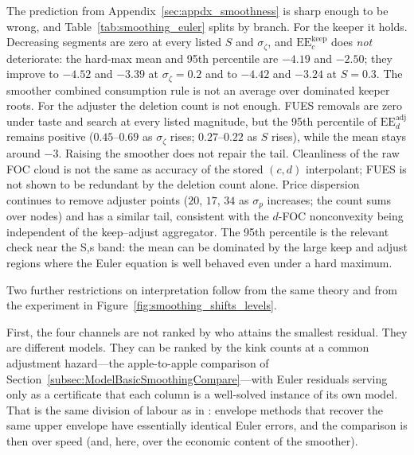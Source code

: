 \begin{table}[htbp]
\centering
\caption{Period-$t$ kink counts and Euler residuals under the hard-max baseline and the same $\sigma_\zeta$, $S$, and $\sigma_p$ sweep as Figure~\ref{fig:smoothing_shifts_levels}. Residuals are mean and 95th percentile of~\eqref{eq:judd_ee} on an off-grid test mesh; constrained points excluded. The $\sigma_p$ adjuster kink count sums over price nodes.}
\label{tab:smoothing_euler}
\small

\end{table}

The prediction from Appendix~\ref{sec:appdx_smoothness} is sharp enough to be wrong, and Table~\ref{tab:smoothing_euler} splits by branch. For the keeper it holds. Decreasing segments are zero at every listed $S$ and $\sigma_\zeta$, and $\mathrm{EE}_c^{\mathrm{keep}}$ does \emph{not} deteriorate: the hard-max mean and 95th percentile are $-4.19$ and $-2.50$; they improve to $-4.52$ and $-3.39$ at $\sigma_\zeta=0.2$ and to $-4.42$ and $-3.24$ at $S=0.3$. The smoother combined consumption rule is not an average over dominated keeper roots. For the adjuster the deletion count is not enough. FUES removals are zero under taste and search at every listed magnitude, but the 95th percentile of $\mathrm{EE}_d^{\mathrm{adj}}$ remains positive ($0.45$--$0.69$ as $\sigma_\zeta$ rises; $0.27$--$0.22$ as $S$ rises), while the mean stays around $-3$. Raising the smoother does not repair the tail. Cleanliness of the raw FOC cloud is not the same as accuracy of the stored $(c,d)$ interpolant; FUES is not shown to be redundant by the deletion count alone. Price dispersion continues to remove adjuster points ($20$, $17$, $34$ as $\sigma_p$ increases; the count sums over nodes) and has a similar tail, consistent with the $d$-FOC nonconvexity being independent of the keep--adjust aggregator. The 95th percentile is the relevant check near the S,s band: the mean can be dominated by the large keep and adjust regions where the Euler equation is well behaved even under a hard maximum.

Two further restrictions on interpretation follow from the same theory and from the experiment in Figure~\ref{fig:smoothing_shifts_levels}.

First, the four channels are not ranked by who attains the smallest residual. They are different models. They can be ranked by the kink counts at a common adjustment hazard---the apple-to-apple comparison of Section~\ref{subsec:ModelBasicSmoothingCompare}---with Euler residuals serving only as a certificate that each column is a well-solved instance of its own model. That is the same division of labour as in \citet{Dobrescu2022-ii}: envelope methods that recover the same upper envelope have essentially identical Euler errors, and the comparison is then over speed (and, here, over the economic content of the smoother).

